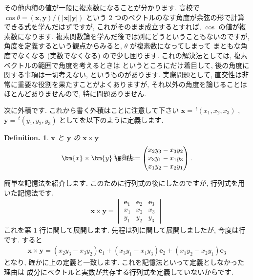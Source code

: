 \documentclass[openany, a4paper, oneside]{jsbook}
\makeatletter
\newcommand*{\defeq}{\mathrel{\rlap{%
\raisebox{0.3ex}{$\m@th\cdot$}}%
\raisebox{-0.3ex}{$\m@th\cdot$}}%
=}
\theoremstyle{break}
\theoremstyle{breakdefn}
\newtheorem{defn}[thm]{Definition.}
\newcommand{\bbR}{\mathbb{R}}
\makeatother
\begin{document}
その他内積の値が一般に複素数になることが分かります.
高校で
$\cos \theta = ( \bm{x} , \bm{y} ) / ( | \bm{x} | | \bm{y} | )$
という 2 つのベクトルのなす角度が余弦の形で計算できる式を学んだはずですが,
これがそのまま成立するとすれば,  $\cos$ の値が複素数になります.
複素関数論を学んだ後では別にどうということもないのですが,
角度を定義するという観点からみると,  $\theta$ が複素数になってしまって
まともな角度でなくなる (実数でなくなる) ので少し困ります.
これの解決法としては, 複素ベクトルの範囲で角度を考えるときは
というところにだけ着目して,
後の角度に関する事項は一切考えない, というものがあります.
実際問題として, 直交性は非常に重要な役割を果たすことがよくありますが,
それ以外の角度を論じることはほとんどありませんので, 特に問題ありません.

次に外積です. これから書く外積は\textgt{ $\bbR^3$ のときにしか定義されない}ことに注意して下さい
$\bm{x}=\, ^{t}(x_{1},x_{2},x_{3})$ ,  $\bm{y}=\, ^t (y_{1},y_{2},y_{3})$ としてを以下のように定義します.
\begin{defn} $\bm{x}$ と $\bm{y}$ の $\bm{x} \times \bm{y}$
\begin{align}
\bm{x} \times \bm{y} \defeq \begin{pmatrix} x_{2}y_{3} - x_{3}y_{2} \\
x_{3}y_{1} - x_{1}y_{3} \\
x_{1}y_{2} - x_{2}y_{1}
\end{pmatrix}.
\end{align}
\end{defn}
簡単な記憶法を紹介します. このために行列式の後にしたのですが, 行列式を用いた記憶法です.
\begin{align}
 \bm{x} \times \bm{y}
 =
 \begin{vmatrix}
   \bm{e}_{1} & \bm{e}_{2} & \bm{e}_{3} \\
   x_{1} & x_{2} & x_{3} \\
   y_{1} & y_{2} & y_{3}
 \end{vmatrix}
\end{align}
これを第 1 行に関して展開します. 先程は列に関して展開しましたが, 今度は行です. すると
\begin{align}
 \bm{x} \times \bm{y}
 =
 (x_{2}y_{3} - x_{3}y_{2})\bm{e}_{1}
 +(x_{3}y_{1} - x_{1}y_{3}) \bm{e}_{2}
 +(x_{1}y_{2} - x_{2}y_{1}) \bm{e}_{3}
\end{align}
となり, 確かに上の定義と一致します. これを記憶法といって定義としなかった理由は
成分にベクトルと実数が共存する行列式を定義していないからです.
\end{document}
